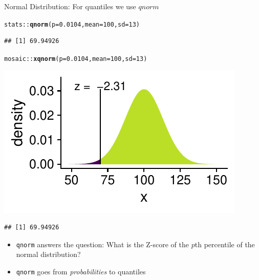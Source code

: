 \documentclass[10pt]{beamer}\usepackage[]{graphicx}\usepackage[]{color}
\makeatletter
\newcommand{\hlnum}[1]{\textcolor[rgb]{0.686,0.059,0.569}{#1}}%
\newcommand{\hlopt}[1]{\textcolor[rgb]{0,0,0}{#1}}%
\newcommand{\hlstd}[1]{\textcolor[rgb]{0.345,0.345,0.345}{#1}}%
\newcommand{\hlkwc}[1]{\textcolor[rgb]{0.333,0.667,0.333}{#1}}%
\newcommand{\hlkwd}[1]{\textcolor[rgb]{0.737,0.353,0.396}{\textbf{#1}}}%
\newenvironment{kframe}{%
 \def\at@end@of@kframe{}%
 \ifinner\ifhmode%
  \def\at@end@of@kframe{\end{minipage}}%
  \begin{minipage}{\columnwidth}%
 \fi\fi%
 \def\FrameCommand##1{\hskip\@totalleftmargin \hskip-\fboxsep
 \colorbox{shadecolor}{##1}\hskip-\fboxsep
     \hskip-\linewidth \hskip-\@totalleftmargin \hskip\columnwidth}%
 \MakeFramed {\advance\hsize-\width
   \@totalleftmargin\z@ \linewidth\hsize
   \@setminipage}}%
 {\par\unskip\endMakeFramed%
 \at@end@of@kframe}
\newenvironment{knitrout}{}{} %
\makeatother
\begin{document}
\begin{frame}[fragile]{Normal Distribution: For quantiles we use $qnorm$}
	
	
	
\begin{knitrout}\tiny
{}\color{fgcolor}\begin{kframe}
\begin{alltt}
\hlstd{stats}\hlopt{::}\hlkwd{qnorm}\hlstd{(}\hlkwc{p} \hlstd{=} \hlnum{0.0104}\hlstd{,} \hlkwc{mean} \hlstd{=} \hlnum{100}\hlstd{,} \hlkwc{sd} \hlstd{=} \hlnum{13}\hlstd{)}
\end{alltt}
\begin{verbatim}
## [1] 69.94926
\end{verbatim}
\end{kframe}
\end{knitrout}
	
	
	
\begin{knitrout}\tiny
{}\color{fgcolor}\begin{kframe}
\begin{alltt}
\hlstd{mosaic}\hlopt{::}\hlkwd{xqnorm}\hlstd{(}\hlkwc{p} \hlstd{=} \hlnum{0.0104}\hlstd{,} \hlkwc{mean} \hlstd{=} \hlnum{100}\hlstd{,} \hlkwc{sd} \hlstd{=} \hlnum{13}\hlstd{)}
\end{alltt}
\end{kframe}

{\centering \includegraphics[width=0.6\linewidth]{figure/probs5-1} 

}


\begin{kframe}\begin{verbatim}
## [1] 69.94926
\end{verbatim}
\end{kframe}
\end{knitrout}
	
	
	
	\small{
		\begin{itemize}
			\item \texttt{qnorm} answers the question: What is the Z-score of the $p$th percentile of the normal distribution?
			
			\item \texttt{qnorm} goes from \textit{probabilities} to quantiles 
		\end{itemize}
	}
\end{frame}
\end{document}
